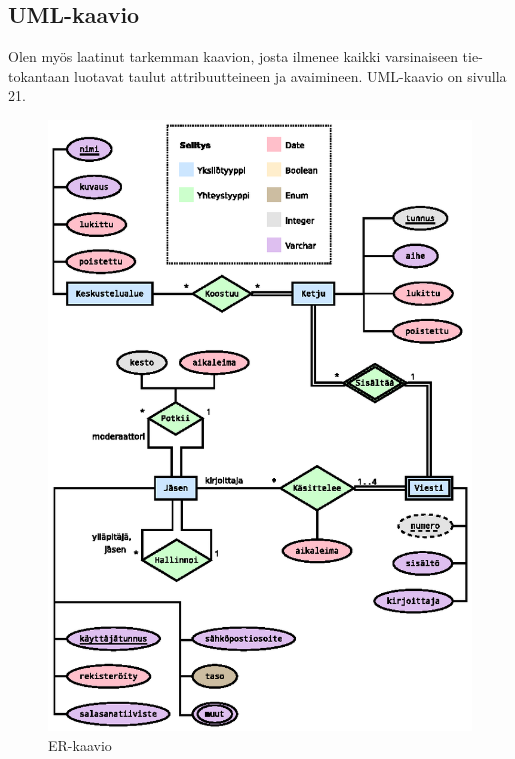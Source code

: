 \documentclass[11pt]{article}
\begin{document}
		\subsection{UML-kaavio} Olen myös laatinut tarkemman kaavion, josta ilmenee kaikki varsinaiseen
		tie-tokantaan luotavat taulut attribuutteineen ja avaimineen. UML-kaavio on sivulla 21.
		
		\newpage
		\thispagestyle{plain}
		\begin{figure}[H]		
			\includegraphics[trim = 6mm 0mm 0mm 20mm, scale = 1.5]{er-kaavio.eps}
			\caption{ER-kaavio}
		\end{figure}
		
\end{document}
